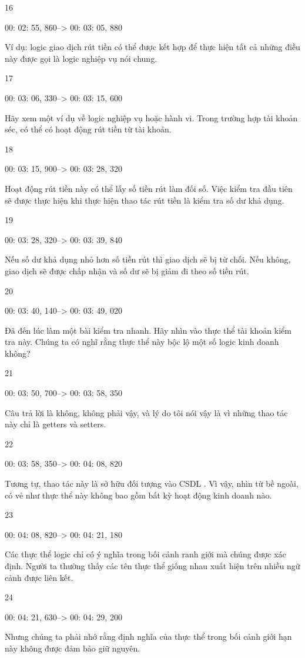 16

00: 02: 55, 860--> 00: 03: 05, 880

Ví dụ: logic giao dịch rút tiền có thể được kết hợp để thực hiện tất cả những điều này được gọi là logic nghiệp vụ nói chung.

17

00: 03: 06, 330--> 00: 03: 15, 600

Hãy xem một ví dụ về logic nghiệp vụ hoặc hành vi. Trong trường hợp tài khoản séc, có thể có hoạt động rút tiền từ tài khoản.

18

00: 03: 15, 900--> 00: 03: 28, 320

Hoạt động rút tiền này có thể lấy số tiền rút làm đối số. Việc kiểm tra đầu tiên sẽ được thực hiện khi thực hiện thao tác rút tiền là kiểm tra số dư khả dụng.

19

00: 03: 28, 320--> 00: 03: 39, 840

Nếu số dư khả dụng nhỏ hơn số tiền rút thì giao dịch sẽ bị từ chối. Nếu không, giao dịch sẽ được chấp nhận và số dư sẽ bị giảm đi theo số tiền rút.

20

00: 03: 40, 140--> 00: 03: 49, 020

Đã đến lúc làm một bài kiểm tra nhanh. Hãy nhìn vào thực thể tài khoản kiểm tra này. Chúng ta có nghĩ rằng thực thể này bộc lộ một số logic kinh doanh không?

21

00: 03: 50, 700--> 00: 03: 58, 350

Câu trả lời là không, không phải vậy, và lý do tôi nói vậy là vì những thao tác này chỉ là getters và setters.

22

00: 03: 58, 350--> 00: 04: 08, 820

Tương tự, thao tác này là sở hữu đối tượng vào CSDL . Vì vậy, nhìn từ bề ngoài, có vẻ như thực thể này không bao gồm bất kỳ hoạt động kinh doanh nào.

23

00: 04: 08, 820--> 00: 04: 21, 180

Các thực thể logic chỉ có ý nghĩa trong bối cảnh ranh giới mà chúng được xác định. Người ta thường thấy các tên thực thể giống nhau xuất hiện trên nhiều ngữ cảnh được liên kết.

24

00: 04: 21, 630--> 00: 04: 29, 200

Nhưng chúng ta phải nhớ rằng định nghĩa của thực thể trong bối cảnh giới hạn này không được đảm bảo giữ nguyên.

